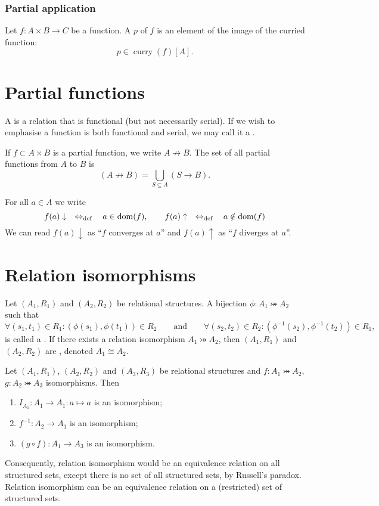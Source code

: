 \subsubsection{Partial application}
\begin{definition}
Let $f: A\times B \to C$ be a function. A  $p$ of $f$ is an element of the image of the curried function:
\[ p\in \operatorname{curry}(f)[A]. \]
\end{definition}

\section{Partial functions}
\begin{definition}
A  is a relation that is functional (but not necessarily serial). If we wish to emphasise a function is both functional and serial, we may call it a .
\end{definition}
If $f\subset A\times B$ is a partial function, we write $A\not \to B$. The set of all partial functions from $A$ to $B$ is
\[ (A\not \to B) = \bigcup _{S\subseteq A}(S\to B). \]

For all $a\in A$ we write
\[ f(a)\downarrow \quad\Leftrightarrow_{\text{def}}\quad a\in\operatorname{dom}(f),\qquad f(a)\uparrow \quad\Leftrightarrow_{\text{def}}\quad a\notin\operatorname{dom}(f) \]
We can read $f(a)\downarrow$ as ``$f$ converges at $a$'' and $f(a)\uparrow$ as ``$f$ diverges at $a$''.

\section{Relation isomorphisms}
\begin{definition}
Let $(A_1, R_1)$ and $(A_2, R_2)$ be relational structures. A bijection $\phi:A_1 \twoheadrightarrowtail A_2$ such that
\[ \forall (s_1,t_1)\in R_1: (\phi(s_1),\phi(t_1))\in R_2 \qquad \text{and} \qquad \forall (s_2,t_2)\in R_2: (\phi^{-1}(s_2),\phi^{-1}(t_2))\in R_1, \]
is called a . If there exists a relation isomorphism $A_1 \twoheadrightarrowtail A_2$, then $(A_1, R_1)$ and $(A_2, R_2)$ are , denoted $A_1 \cong A_2$.
\end{definition}

\begin{lemma} \label{lemma:isomorphismEquivalence}
Let $(A_1, R_1)$, $(A_2, R_2)$ and $(A_3, R_3)$ be relational structures and $f:A_1 \twoheadrightarrowtail A_2$, $g:A_2 \twoheadrightarrowtail A_3$ isomorphisms. Then
\begin{enumerate}
\item $I_{A_1}: A_1 \to A_1: a\mapsto a$ is an isomorphism;
\item $f^{-1}: A_2\to A_1$ is an isomorphism;
\item $(g\circ f): A_1\to A_3$ is an isomorphism.
\end{enumerate}
\end{lemma}
Consequently, relation isomorphism would be an equivalence relation on all structured sets, except there is no set of all structured sets, by Russell's paradox. Relation isomorphism can be an equivalence relation on a (restricted) set of structured sets.

